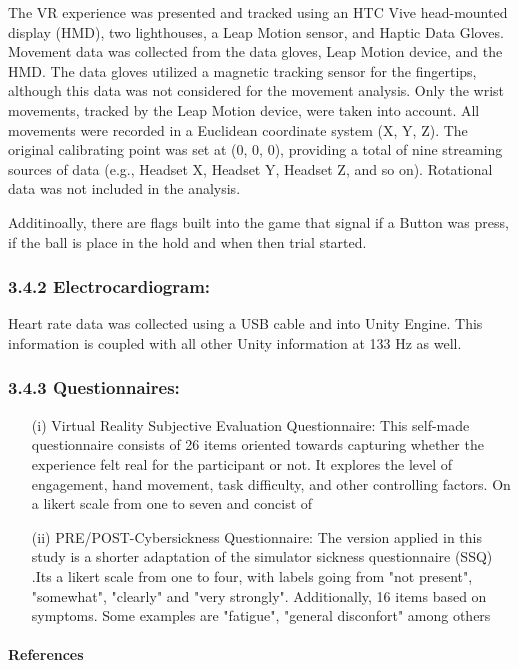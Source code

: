 \documentclass[12pt,oneside,openright]{report}
\begin{document}
    The VR experience was presented and tracked using an HTC Vive head-mounted display (HMD), two lighthouses, a Leap Motion sensor, and Haptic Data Gloves. Movement data was collected from the data gloves, Leap Motion device, and the HMD. The data gloves utilized a magnetic tracking sensor for the fingertips, although this data was not considered for the movement analysis. Only the wrist movements, tracked by the Leap Motion device, were taken into account. All movements were recorded in a Euclidean coordinate system (X, Y, Z). The original calibrating point was set at (0, 0, 0), providing a total of nine streaming sources of data (e.g., Headset X, Headset Y, Headset Z, and so on). Rotational data was not included in the analysis.

    Additinoally, there are flags built into the game that signal if a Button was press, if the ball is place in the hold and when then trial started. 

\subsubsection*{3.4.2 Electrocardiogram:} 

Heart rate data was collected using a USB cable and into Unity Engine. This information is coupled with all other Unity information at 133 Hz as well.

\subsubsection*{3.4.3 Questionnaires:}

\begin{enumerate}
  \item[(i)] Virtual Reality Subjective Evaluation Questionnaire: This self-made questionnaire consists of 26 items oriented towards capturing whether the experience felt real for the participant or not. It explores the level of engagement, hand movement, task difficulty, and other controlling factors. On a likert scale from one to seven and concist of  
  \item[(ii)] PRE/POST-Cybersickness Questionnaire: The version applied in this study is a shorter adaptation of the simulator sickness questionnaire (SSQ) \cite{SSQ93}.Its a likert scale from one to four, with labels going from "not present", "somewhat", "clearly" and "very strongly". Additionally, 16 items based on symptoms. Some examples are "fatigue", "general disconfort" among others
\end{enumerate}


\pagebreak
\paragraph{\textbf{References}}
\printbibliography[heading=none]
\end{document}
